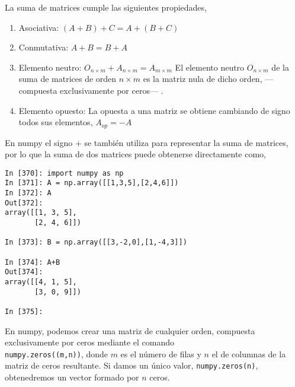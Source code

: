 \begin{paracol}{2}
La suma de matrices cumple las siguientes propiedades,
\begin{enumerate}
\item Asociativa: $(A+B)+C=A+(B+C)$
\item Conmutativa: $A+B=B+A$
\item Elemento neutro: $O_{n\times m}+A_{n\times m}=A_{m\times m}$ El elemento neutro $O_{n\times m}$ de la suma de matrices de orden $n\times m$ es la matriz nula de dicho orden, ---compuesta exclusivamente por ceros--- . 
\item Elemento opuesto: La opuesta a una matriz se obtiene cambiando de signo todos sus elementos, $A_{op}=-A$
\end{enumerate}
En numpy el signo $+$ se también utiliza para representar la suma de matrices, por lo que la suma de dos matrices puede obtenerse directamente como,
\begin{center}
    \begin{minipage}{.5\textwidth}
    \begin{verbatim}
In [370]: import numpy as np
In [371]: A = np.array([[1,3,5],[2,4,6]])
In [372]: A
Out[372]: 
array([[1, 3, 5],
       [2, 4, 6]])

In [373]: B = np.array([[3,-2,0],[1,-4,3]])

In [374]: A+B
Out[374]: 
array([[4, 1, 5],
       [3, 0, 9]])

In [375]: 
    \end{verbatim}
        
    \end{minipage}
\end{center}



En numpy, podemos crear una matriz de cualquier orden, compuesta exclusivamente por ceros mediante el comando\\ \texttt{numpy.zeros((m,n))}, donde $m$ es el número de filas y $n$ el de columnas de la matriz de ceros resultante. Si damos un único valor, \texttt{numpy.zeros(n)}, obtenedremos un vector formado por $n$ ceros.
\end{paracol}
